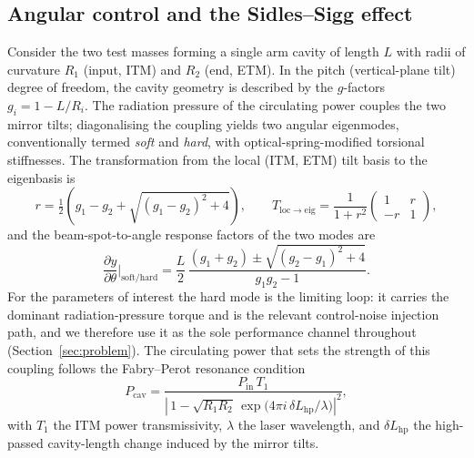 \documentclass[11pt,a4paper]{article}
\begin{document}
\subsection{Angular control and the Sidles--Sigg effect}\label{sec:bg-ss}
Consider the two test masses forming a single arm cavity of length $L$ with
radii of curvature $R_1$ (input, ITM) and $R_2$ (end, ETM). In the pitch
(vertical-plane tilt) degree of freedom, the cavity geometry is described by the
$g$-factors $g_i = 1 - L/R_i$. The radiation pressure of the circulating power
couples the two mirror tilts; diagonalising the coupling yields two angular
eigenmodes, conventionally termed \emph{soft} and \emph{hard}, with
optical-spring-modified torsional stiffnesses. The transformation from the local
(ITM, ETM) tilt basis to the eigenbasis is
\begin{equation}
  r = \tfrac{1}{2}\!\left(g_1 - g_2 + \sqrt{(g_1-g_2)^2 + 4}\right),\qquad
  T_{\mathrm{loc}\to\mathrm{eig}} = \frac{1}{1+r^2}\begin{pmatrix} 1 & r \\ -r & 1\end{pmatrix},
  \label{eq:eigen}
\end{equation}
and the beam-spot-to-angle response factors of the two modes are
\begin{equation}
  \frac{\partial y}{\partial\theta}\bigg|_{\mathrm{soft/hard}}
  = \frac{L}{2}\,\frac{(g_1+g_2)\pm\sqrt{(g_2-g_1)^2+4}}{g_1 g_2 - 1}.
  \label{eq:dydth}
\end{equation}
For the parameters of interest the hard mode is the limiting loop: it carries
the dominant radiation-pressure torque and is the relevant control-noise
injection path, and we therefore use it as the sole performance channel
throughout (Section~\ref{sec:problem}). The circulating power that sets the
strength of this coupling follows the Fabry--Perot resonance condition
\begin{equation}
  P_{\mathrm{cav}} = \frac{P_{\mathrm{in}}\,T_1}
  {\left|\,1 - \sqrt{R_1 R_2}\,\exp\!\big(4\pi i\,\delta L_{\mathrm{hp}}/\lambda\big)\right|^2},
  \label{eq:cavpow}
\end{equation}
with $T_1$ the ITM power transmissivity, $\lambda$ the laser wavelength, and
$\delta L_{\mathrm{hp}}$ the high-passed cavity-length change induced by the
mirror tilts.
\end{document}
